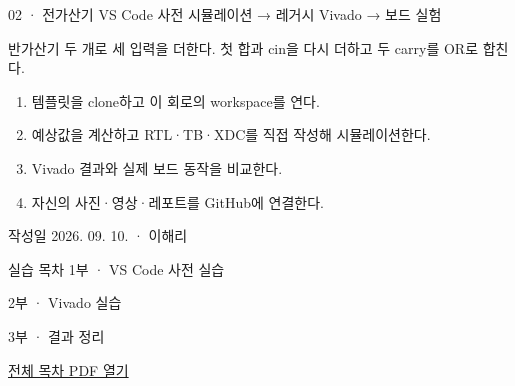 
\renewcommand{\labonehome}{\hyperlink{legacy-02-contents}{\contentsbutton}}
\renewcommand{\legacySource}[1]{}
\providecommand{\terminalbox}[1]{\par\vspace{0.15cm}{\setlength{\fboxsep}{7pt}\colorbox{black}{\parbox{\dimexpr\textwidth-14pt\relax}{\color{white}\ttfamily\fontsize{7}{9}\selectfont #1}}}\par\vspace{0.15cm}}

\begingroup
\renewcommand{\small}{\fontsize{9}{11}\selectfont}
\begin{frame}{02 · 전가산기}\relax
\small
VS Code 사전 시뮬레이션 → 레거시 Vivado → 보드 실험\par\vspace{0.22cm}반가산기 두 개로 세 입력을 더한다. 첫 합과 cin을 다시 더하고 두 carry를 OR로 합친다.\par\begin{enumerate}\setlength{\itemsep}{0.22cm}
\item 템플릿을 clone하고 이 회로의 workspace를 연다.
\item 예상값을 계산하고 RTL·TB·XDC를 직접 작성해 시뮬레이션한다.
\item Vivado 결과와 실제 보드 동작을 비교한다.
\item 자신의 사진·영상·레포트를 GitHub에 연결한다.
\end{enumerate}
작성일 2026. 09. 10. · 이해리\par
\end{frame}

\begin{frame}[label=legacy-02-contents]{실습 목차}\relax
\small
1부 · VS Code 사전 실습\par{}\par\vspace{0.2cm}
\par\vspace{0.4cm}
2부 · Vivado 실습\par{}\par\vspace{0.4cm}
3부 · 결과 정리\par{}\par\vspace{0.35cm}
\href{04.LAB1_00_CONTENTS.pdf}{전체 목차 PDF 열기}
\end{frame}

